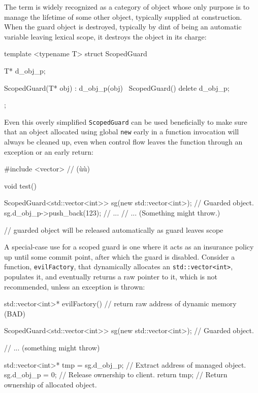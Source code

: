 The term  is widely recognized as a category of
object whose only purpose is to manage the lifetime of some other
object, typically supplied at construction. When the guard object is
destroyed, typically by dint of being an automatic variable leaving
lexical scope, it destroys the object in its charge:

\begin{emcppslisting}[emcppsbatch=e22]
template <typename T>
struct ScopedGuard
{
   T* d_obj_p;

   ScopedGuard(T* obj) : d_obj_p(obj) { }
   ~ScopedGuard() { delete d_obj_p; }
};
\end{emcppslisting}
    

\noindent Even this overly simplified \lstinline!ScopedGuard! can be used
beneficially to make sure that an object allocated using global
\lstinline!new! early in a function invocation will always be cleaned up,
even when control flow leaves the function through an exception or an
early return:

\begin{emcppslisting}[emcppsbatch=e22]
#include <vector>  // (ù{}ù)

void test()
{
    ScopedGuard<std::vector<int>> sg(new std::vector<int>);  // Guarded object.
    sg.d_obj_p->push_back(123);
    // ...
    // ...              (Something might throw.)

}  // guarded object will be released automatically as guard leaves scope
\end{emcppslisting}
    

\noindent A special-case use for a scoped guard is one where it acts as an
insurance policy up until some commit point, after which the guard is
disabled. Consider a function, \lstinline!evilFactory!, that dynamically
allocates an \lstinline!std::vector<int>!, populates it, and eventually
returns a raw pointer to it, which is not recommended, unless an
exception is thrown:

\begin{emcppslisting}[emcppsbatch=e22]
std::vector<int>* evilFactory()  // return raw address of dynamic memory (BAD)
{
    ScopedGuard<std::vector<int>> sg(new std::vector<int>);  // Guarded object.

    // ...              (something might throw)

    std::vector<int>* tmp = sg.d_obj_p;  // Extract address of managed object.
    sg.d_obj_p = 0;                      // Release ownership to client.
    return tmp;                          // Return ownership of allocated object.
}
\end{emcppslisting}
    

